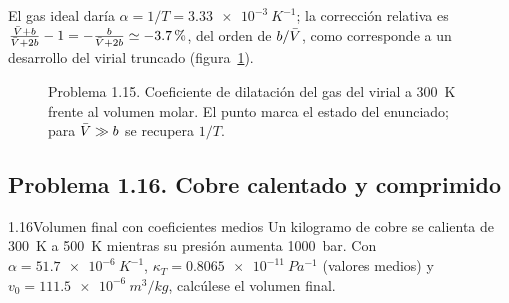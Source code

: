 \begin{observacion}
El gas ideal daría $\alpha=1/T=\SI{3,33e-3}{K^{-1}}$; la corrección relativa es
$\frac{\bar{V}+b}{\bar{V}+2b}-1=-\frac{b}{\bar{V}+2b}\simeq\SI{-3,7}{\percent}$, del orden de $b/\bar{V}$, como corresponde
a un desarrollo del virial truncado (figura~\ref{fig:p115}).
\end{observacion}

\begin{figure}[htbp]
\centering
{}
\caption{Problema 1.15. Coeficiente de dilatación del gas del virial a \SI{300}{K} frente al volumen
molar. El punto marca el estado del enunciado; para $\bar{V}\gg b$ se recupera $1/T$.}
\label{fig:p115}
\end{figure}

\subsection{Problema 1.16. Cobre calentado y comprimido}
\begin{problema}{1.16}{Volumen final con coeficientes medios}
Un kilogramo de cobre se calienta de \SI{300}{K} a \SI{500}{K} mientras su presión aumenta
\SI{1000}{bar}. Con $\alpha=\SI{51,7e-6}{K^{-1}}$, $\kappa_T=\SI{0,8065e-11}{Pa^{-1}}$ (valores medios) y
$v_0=\SI{111,5e-6}{m^3/kg}$, calcúlese el volumen final.
\end{problema}

